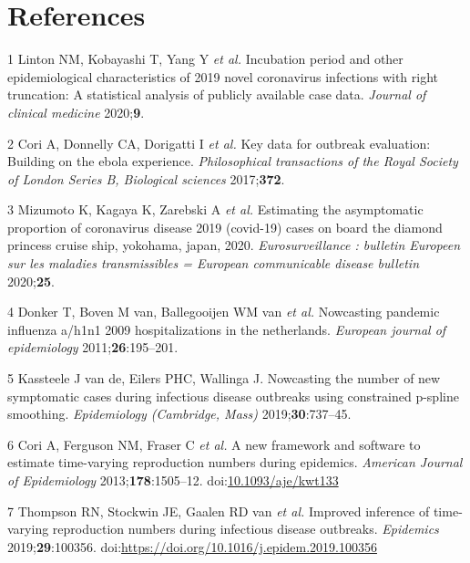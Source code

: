 \documentclass[
]{article}
\begin{document}
\hypertarget{references}{%
\section*{References}\label{references}}

\hypertarget{refs}{}
\leavevmode\hypertarget{ref-Linton:2020gg}{}%
1 Linton NM, Kobayashi T, Yang Y \emph{et al.} Incubation period and
other epidemiological characteristics of 2019 novel coronavirus
infections with right truncation: A statistical analysis of publicly
available case data. \emph{Journal of clinical medicine}
2020;\textbf{9}.

\leavevmode\hypertarget{ref-Cori:2017fg}{}%
2 Cori A, Donnelly CA, Dorigatti I \emph{et al.} Key data for outbreak
evaluation: Building on the ebola experience. \emph{Philosophical
transactions of the Royal Society of London Series B, Biological
sciences} 2017;\textbf{372}.

\leavevmode\hypertarget{ref-Mizumoto:2020ct}{}%
3 Mizumoto K, Kagaya K, Zarebski A \emph{et al.} Estimating the
asymptomatic proportion of coronavirus disease 2019 (covid-19) cases on
board the diamond princess cruise ship, yokohama, japan, 2020.
\emph{Eurosurveillance : bulletin Europeen sur les maladies
transmissibles = European communicable disease bulletin}
2020;\textbf{25}.

\leavevmode\hypertarget{ref-Donker:2011fk}{}%
4 Donker T, Boven M van, Ballegooijen WM van \emph{et al.} Nowcasting
pandemic influenza a/h1n1 2009 hospitalizations in the netherlands.
\emph{European journal of epidemiology} 2011;\textbf{26}:195--201.

\leavevmode\hypertarget{ref-vandeKassteele:2019cn}{}%
5 Kassteele J van de, Eilers PHC, Wallinga J. Nowcasting the number of
new symptomatic cases during infectious disease outbreaks using
constrained p-spline smoothing. \emph{Epidemiology (Cambridge, Mass)}
2019;\textbf{30}:737--45.

\leavevmode\hypertarget{ref-cori2013}{}%
6 Cori A, Ferguson NM, Fraser C \emph{et al.} A new framework and
software to estimate time-varying reproduction numbers during epidemics.
\emph{American Journal of Epidemiology} 2013;\textbf{178}:1505--12.
doi:\href{https://doi.org/10.1093/aje/kwt133}{10.1093/aje/kwt133}

\leavevmode\hypertarget{ref-THOMPSON2019100356}{}%
7 Thompson RN, Stockwin JE, Gaalen RD van \emph{et al.} Improved
inference of time-varying reproduction numbers during infectious disease
outbreaks. \emph{Epidemics} 2019;\textbf{29}:100356.
doi:\href{https://doi.org/https://doi.org/10.1016/j.epidem.2019.100356}{https://doi.org/10.1016/j.epidem.2019.100356}
\end{document}
